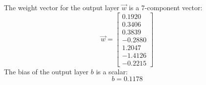 \documentclass[twoside,english,1p,final,sort&compress]{elsarticle}
\theoremstyle{plain}
\begin{document}
The weight vector for the output layer $\overrightarrow{w}$ is a 7-component vector:
\begin{equation*}
\overrightarrow{w} = \left[
\begin{array}{r}
	0.1920  \\
	0.3406  \\
	0.3839  \\
	-0.2880 \\
	1.2047  \\
	-1.4126 \\
	-0.2215
\end{array}\right]
\end{equation*}
The bias of the output layer $b$ is a scalar:
\begin{equation*}
b = 0.1178
\end{equation*}
\end{document}
